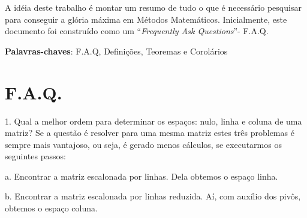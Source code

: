\documentclass[
	article,			%
	11pt,				%
	oneside,			%
	a4paper,			%
	english,			%
	brazil,				%
	sumario=tradicional
	]{abntex2}
\begin{document}
\frenchspacing 


%
%
\maketitle

\begin{resumoumacoluna}
A idéia deste trabalho é montar um resumo de tudo o que é necessário pesquisar para conseguir a glória máxima em Métodos Matemáticos. Inicialmente, este documento foi construído como um ``\textit{Frequently Ask Questions}''- F.A.Q.
 
 \vspace{\onelineskip}
 
 \noindent
 \textbf{Palavras-chaves}: F.A.Q, Definições, Teoremas e Corolários
\end{resumoumacoluna}


\textual

\section*{F.A.Q.}

1.    Qual a melhor ordem para determinar os espaços: nulo, linha e coluna de uma matriz? Se a questão é resolver para uma mesma matriz estes três problemas é sempre mais vantajoso, ou seja, é gerado menos cálculos, se executarmos os seguintes passos:

a.    Encontrar a matriz escalonada por linhas. Dela obtemos o espaço linha.

b.    Encontrar a matriz escalonada por linhas reduzida. Aí, com auxílio dos pivôs, obtemos o espaço coluna.
\end{document}
